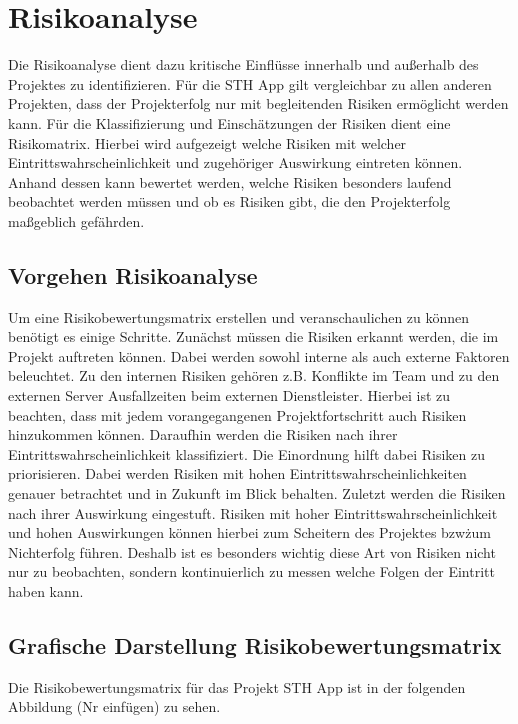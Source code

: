 \chapter{Risikoanalyse}

Die Risikoanalyse dient dazu kritische Einflüsse innerhalb und außerhalb des Projektes zu identifizieren. Für die STH App gilt vergleichbar zu allen anderen Projekten, dass der Projekterfolg nur mit begleitenden Risiken ermöglicht werden kann. Für die Klassifizierung und Einschätzungen der Risiken dient eine Risikomatrix. Hierbei wird aufgezeigt welche Risiken mit welcher Eintrittswahrscheinlichkeit und zugehöriger Auswirkung eintreten können. Anhand dessen kann bewertet werden, welche Risiken besonders laufend beobachtet werden müssen und ob es Risiken gibt, die den Projekterfolg maßgeblich gefährden.

\section{Vorgehen Risikoanalyse}
Um eine Risikobewertungsmatrix erstellen und veranschaulichen zu können benötigt es einige Schritte. Zunächst müssen die Risiken erkannt werden, die im Projekt auftreten können. Dabei werden sowohl interne als auch externe Faktoren beleuchtet. Zu den internen Risiken gehören z.B. Konflikte im Team und zu den externen Server Ausfallzeiten beim externen Dienstleister. Hierbei ist zu beachten, dass mit jedem vorangegangenen Projektfortschritt auch Risiken hinzukommen können. Daraufhin werden die Risiken nach ihrer Eintrittswahrscheinlichkeit klassifiziert. Die Einordnung hilft dabei Risiken zu priorisieren. Dabei werden Risiken mit hohen Eintrittswahrscheinlichkeiten genauer betrachtet und in Zukunft im Blick behalten. Zuletzt werden die Risiken nach ihrer Auswirkung eingestuft. Risiken mit hoher Eintrittswahrscheinlichkeit und hohen Auswirkungen können hierbei zum Scheitern des Projektes bzw\. zum Nichterfolg führen. Deshalb ist es besonders wichtig diese Art von Risiken nicht nur zu beobachten, sondern kontinuierlich zu messen welche Folgen der Eintritt haben kann.


\section{Grafische Darstellung Risikobewertungsmatrix}
Die Risikobewertungsmatrix für das Projekt STH App ist in der folgenden Abbildung (Nr einfügen) zu sehen.

